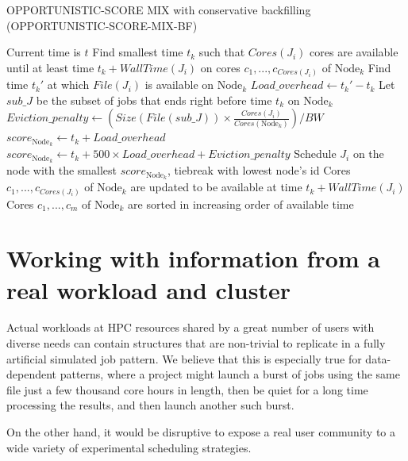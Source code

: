 \documentclass[conference,10pt]{IEEEtran}
\newcommand{\Node}[1]{\ensuremath{\mathrm{Node}_{#1}}\xspace}
\newcommand{\file}{\ensuremath{\mathit{File}}\xspace}
\newcommand{\size}{\ensuremath{\mathit{Size}}\xspace}
\newcommand{\bandwidth}{\mathit{BW}\xspace}
\newcommand{\core}{\mathit{Cores}\xspace}
\newcommand{\walltime}{\mathit{WallTime}\xspace}
\newcommand{\nodeset}{\ensuremath{\mathbb{N}}\xspace}
\begin{document}
\begin{algorithm}[htbp]
\caption{OPPORTUNISTIC-SCORE MIX with conservative backfilling (OPPORTUNISTIC-SCORE-MIX-BF)}
\begin{algorithmic}[1]
	\Statex Current time is $t$
		\ForEach{$\Node{k} \in \nodeset$}
			\State Find smallest time $t_k$ such that $\core(J_i)$ cores are available until at least time $t_k + \walltime(J_i)$ on cores $c_1, ..., c_{\core(J_i)}$ of $\Node{k}$
			\State Find time $t_k'$ at which $\file(J_i)$ is available on $\Node{k}$
			\State $Load\_overhead \gets t_k' - t_k$ 
			\State Let $\mathit{sub\_J}$ be the subset of jobs that ends right before time $t_k$ on $\Node{k}$
			\State $Eviction\_penalty \gets (\size(\file(\mathit{sub\_J})) \times \frac{\core(J_i)}{\core(\Node{k})})/\bandwidth$
				\State $score_{\Node{k}} \gets t_k + Load\_overhead$
			\Else
				\State $score_{\Node{k}} \gets t_k + 500 \times Load\_overhead + Eviction\_penalty$
			\EndIf
		\EndFor
		\State Schedule $J_i$ on the node with the smallest $score_{\Node{k}}$, tiebreak with lowest node's id
		\State Cores $c_1, ..., c_{\core(J_i)}$ of $\Node{k}$ are updated to be available at time $t_k + \walltime(J_i)$
		\State Cores $c_1, ..., c_m$ of $\Node{k}$ are sorted in increasing order of available time
	\EndFor
\end{algorithmic}
\end{algorithm}

\section{Working with information from a real workload and cluster}\label{sec.working}
Actual workloads at HPC resources shared by a great number of users with diverse needs can contain structures
that are non-trivial to replicate in a fully artificial simulated job pattern. We believe that this is especially
true for data-dependent patterns, where a project might launch a burst of jobs using the same file just a few thousand
core hours in length, then be quiet for a long time processing the results, and then launch another such burst.

On the other hand, it would be disruptive to expose a real user community to a wide variety of experimental scheduling strategies.
\end{document}
